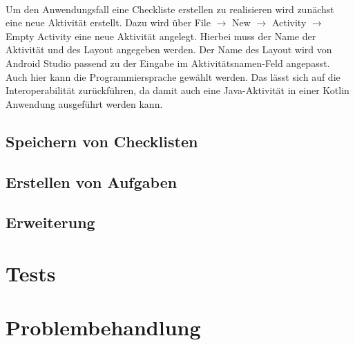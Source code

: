 \\


Um den Anwendungsfall eine Checkliste erstellen zu realisieren wird zunächst eine neue Aktivität erstellt. Dazu wird über File $\rightarrow$ New $\rightarrow$ Activity $\rightarrow$ Empty Activity eine neue Aktivität angelegt. Hierbei muss der Name der Aktivität und des Layout angegeben werden. Der Name des Layout wird von Android Studio passend zu der Eingabe im Aktivitätsnamen-Feld angepasst. Auch hier kann die Programmiersprache gewählt werden. Das lässt sich auf die Interoperabilität zurückführen, da damit auch eine Java-Aktivität in einer Kotlin Anwendung ausgeführt werden kann.

\subsection{Speichern von Checklisten}\label{subsec:speichereCheckliste}

\subsection{Erstellen von Aufgaben}\label{subsec:erstelleAufgaben}

\subsection{Erweiterung}\label{subsec:erweiterung}

\section{Tests}\label{sec:tests}

\section{Problembehandlung}\label{sec:problem}